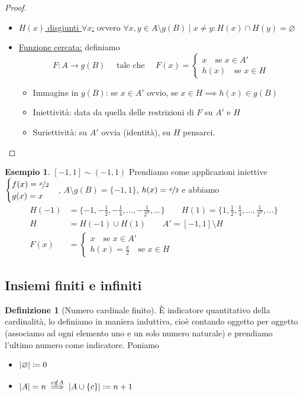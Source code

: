 \documentclass[a4paper,10pt]{article}
\theoremstyle{definition}
\theoremstyle{indentdefinition}
\newtheorem{defn}{Definizione}[section]
\theoremstyle{indentpostulate}
\theoremstyle{indenttheorem}
\theoremstyle{myremark}
\newtheorem{example*}{Esempio}
\theoremstyle{indentgeneral}
\begin{document}
\begin{proof}
\begin{itemize}
        \item \underline{$H(x)$ disgiunti $\forall x$:} ovvero $\forall x,y\in A\setminus g(B)\mid x\ne y: H(x)\cap H(y)=\varnothing$
        \item \underline{Funzione cercata:} definiamo
        $$F:A\to g(B)\quad\text{ tale che }\quad F(x)=\begin{cases}
            x\quad \text{se }x\in A'\\
            h(x) \quad \text{se }x\in H
        \end{cases}$$
        \begin{itemize}
            \item Immagine in $g(B)$: se $x\in A'$ ovvio, se $x\in H\implies h(x)\in g(B)$
            \item Iniettività: data da quella delle restrizioni di $F$ su $A'$ e $H$
            \item Suriettività: su $A'$ ovvia (identità), su $H$ pensarci.
        \end{itemize}
    \end{itemize}
\end{proof}

\begin{example*}\underline{$[-1,1]\sim(-1,1)$} Prendiamo come applicazioni iniettive $\begin{cases}
    f(x)=\nicefrac{x}{2}\\
    g(x)=x\end{cases}$, $A\setminus g(B)=\{-1,1\}$, $h(x)=\nicefrac{x}{2}$ e abbiamo
    \begin{align*}
        H(-1)&=\{-1,-\frac{1}{2},-\frac{1}{4},\dots,-\frac{1}{2^n},\dots\}\qquad  H(1)=\{1,\frac{1}{2},\frac{1}{4},\dots,\frac{1}{2^n},\dots\}\\
        H&=H(-1)\cup H(1)\qquad A'=[-1,1]\setminus H\\
        F(x)&=\begin{cases}
              x\quad \text{se }x\in A'\\
            h(x)=\frac{x}{2} \quad \text{se }x\in H
        \end{cases}
    \end{align*}
    
\end{example*}

\subsection{Insiemi finiti e infiniti}
\begin{defn}[Numero cardinale finito] È indicatore quantitativo della cardinalità, lo definiamo in maniera induttiva, cioè contando oggetto per oggetto (associamo ad ogni elemento uno e un solo numero naturale) e prendiamo l'ultimo numero come indicatore. Poniamo
\begin{itemize}
    \item $\abs{\varnothing}\coloneqq0$
    \item $\abs{A}=n\overset{c\notin A}{\implies}\abs{A\cup \{c\}}\coloneqq n+1$
\end{itemize}
\end{defn}
\end{document}
